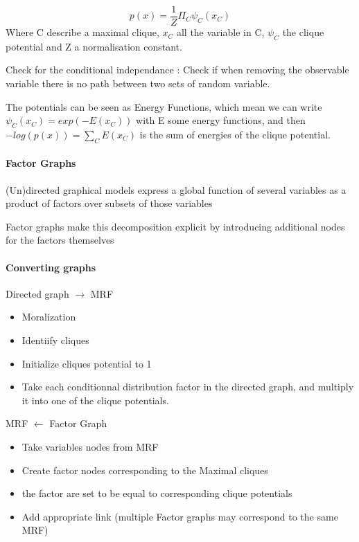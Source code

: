 				\[
					p(x) = \frac{1}{Z} \Pi_C \psi _C(x_C)
				\]
				Where C describe a maximal clique, $x_C$ all the variable in C, $\psi_C$ the clique potential and Z a normalisation constant. 

				Check for the conditional independance : Check if when removing the observable variable there is no path between two sets of random variable.

				The potentials can be seen as Energy Functions, which mean we can write $\psi_C(x_C) = exp(-E(x_C))$ with E some energy functions, and then $-log(p(x)) = \sum_C E(x_C)$ is the sum of energies of the clique potential.



			\paragraph*{Factor Graphs}

				(Un)directed graphical models express a global function of several variables as a product of factors over subsets of those variables

				Factor graphs make this decomposition explicit by introducing additional nodes for the factors themselves


			\paragraph*{Converting graphs}


				Directed graph  $\rightarrow$ MRF
				\begin{itemize}
					\item Moralization
					\item Identiify cliques
					\item Initialize cliques potential to 1
					\item Take each conditionnal distribution factor in the directed graph, and multiply it into one of the clique potentials.
				\end{itemize}

				MRF $\leftarrow$ Factor Graph
				\begin{itemize}
					\item Take variables nodes from MRF
					\item Create factor nodes corresponding to the Maximal cliques
					\item the factor are set to be equal to corresponding clique potentials
					\item Add appropriate link (multiple Factor graphs may correspond to the same MRF)
				\end{itemize}

